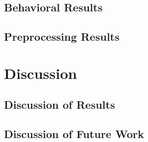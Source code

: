 \documentclass[11pt]{article}
\begin{document}
    \subsection{Behavioral Results}
                
    \subsection{Preprocessing Results}
                

\section{Discussion}
    \subsection{Discussion of Results}
            

    \subsection{Discussion of Future Work}
            


\end{document}
